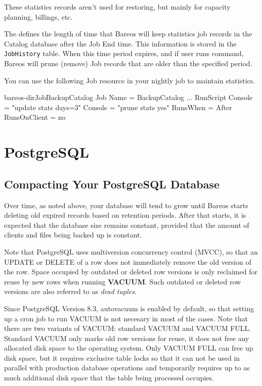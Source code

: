 These statistics records aren't used for restoring, but mainly for
capacity planning, billings, etc.

The  defines
the length of time that Bareos will keep statistics job records in the Catalog
database after the Job End time. This information is stored in the \texttt{JobHistory} table.
When this time
period expires, and if user runs  command, Bareos will
prune (remove) Job records that are older than the specified period.

You can use the following Job resource in your nightly 
job to maintain statistics.

\begin{bareosConfigResource}{bareos-dir}{Job}{BackupCatalog}
Job {
  Name = BackupCatalog
  ...
  RunScript {
    Console = "update stats days=3"
    Console = "prune stats yes"
    RunsWhen = After
    RunsOnClient = no
  }
}
\end{bareosConfigResource}


\section{PostgreSQL}


\subsection{Compacting Your PostgreSQL Database}
\label{CompactingPostgres}

Over time, as noted above, your database will tend to grow until Bareos starts
deleting old expired records based on retention periods. After that starts,
it is expected that the database size remains constant, provided that the amount
of clients and files being backed up is constant.

Note that PostgreSQL uses multiversion concurrency control (MVCC), so that
an UPDATE or DELETE of a row does not immediately remove the old version of the
row.  Space occupied by outdated or deleted row versions is only reclaimed for
reuse by new rows when running \textbf{VACUUM}. Such outdated or deleted row versions
are also referred to as \emph{dead tuples}.

Since PostgreSQL Version 8.3, autovacuum is enabled by default, so that setting
up a cron job to run VACUUM is not necesary in most of the cases. Note that
there are two variants of VACUUM: standard VACUUM and VACUUM FULL. Standard
VACUUM only marks old row versions for reuse, it does not free any allocated
disk space to the operating system. Only VACUUM FULL can free up disk space,
but it requires exclusive table locks so that it can not be used in parallel
with production database operations and temporarily requires up to as much
additional disk space that the table being processed occupies.

